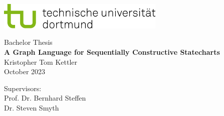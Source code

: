 \begin{titlepage}
\vspace*{-2cm}
\newlength{\links}
\setlength{\links}{-1.5cm}
\sffamily
\hspace*{\links}
\begin{minipage}{12.5cm}
\includegraphics[width=8cm]{bilder/tud_logo_rgb}
\end{minipage}

\vspace*{4cm}

\hspace*{\links}
\hspace*{-0.2cm}
\begin{minipage}{9cm}
\large
\begin{center}
{\Large Bachelor Thesis} \\
\vspace*{1cm}
\textbf{A Graph Language for Sequentially Constructive Statecharts} \\
\vspace*{1cm}
Kristopher Tom Kettler\\
October 2023
\end{center}
\end{minipage}
\normalsize
\vspace*{5.5cm}


\vspace*{2.1cm}

\hspace*{\links}
\begin{minipage}[b]{5cm}
\raggedright
Supervisors: \\
Prof. Dr. Bernhard Steffen \\
Dr. Steven Smyth \\
\end{minipage}


\end{titlepage}
